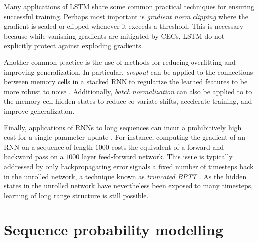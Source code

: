 Many applications of LSTM
\citep{devlin2014fast,zaremba2015empirical,pascanu2013construct} share some
common practical techniques for ensuring successful training. Perhaps most
important is \emph{gradient norm clipping} \citep{Mikolov2012,Pascanu2012}
where the gradient is scaled or clipped whenever it exceeds a threshold. This
is necessary because while vanishing gradients are mitigated by CECs, LSTM do
not explicitly protect against exploding gradients.

Another common practice is the use of methods for reducing overfitting and
improving generalization. In particular, \emph{dropout}
\citep{srivastava2014dropout} can be applied to the connections between memory
cells in a stacked RNN to regularize the learned features to be more robust to
noise \citep{zaremba2014recurrent}. Additionally, \emph{batch normalization}
\citep{ioffe2015batch} can also be applied to to the memory cell hidden states
to reduce co-variate shifts, accelerate training, and improve generalization.

Finally, applications of RNNs to long sequences can incur a prohibitively high
cost for a single parameter update \citep{citeulike:13881859}. For instance,
computing the gradient of an RNN on a sequence of length $1000$ costs the
equivalent of a forward and backward pass on a $1000$ layer feed-forward
network. This issue is typically addressed by only backpropagating error
signals a fixed number of timesteps back in the unrolled network, a technique
known as \emph{truncated BPTT} \citep{williams1990efficient}. As the hidden
states in the unrolled network have nevertheless been exposed to many
timesteps, learning of long range structure is still possible.

\section{Sequence probability modelling}


